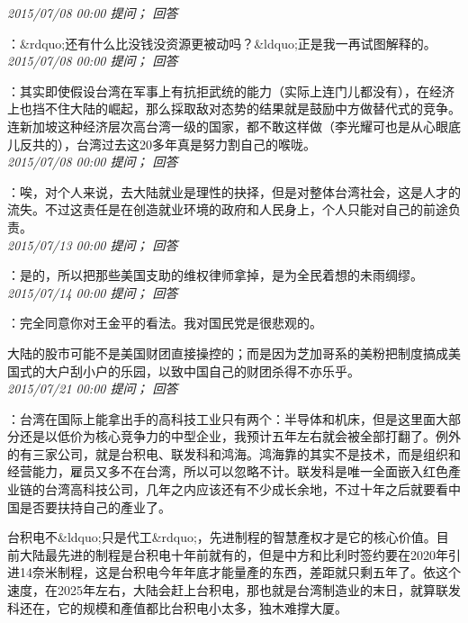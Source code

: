 \documentclass[twocolumn]{ctexart}
\begin{document}
\textit{\hfill\noindent\small 2015/07/08 00:00 提问； 回答}

：\&rdquo;还有什么比没钱没资源更被动吗？\&ldquo;正是我一再试图解释的。\\

\textit{\hfill\noindent\small 2015/07/08 00:00 提问； 回答}

：其实即使假设台湾在军事上有抗拒武统的能力（实际上连门儿都没有），在经济上也挡不住大陆的崛起，那么採取敌对态势的结果就是鼓励中方做替代式的竞争。连新加坡这种经济层次高台湾一级的国家，都不敢这样做（李光耀可也是从心眼底儿反共的），台湾过去这20多年真是努力割自己的喉咙。\\

\textit{\hfill\noindent\small 2015/07/08 00:00 提问； 回答}

：唉，对个人来说，去大陆就业是理性的抉择，但是对整体台湾社会，这是人才的流失。不过这责任是在创造就业环境的政府和人民身上，个人只能对自己的前途负责。\\

\textit{\hfill\noindent\small 2015/07/13 00:00 提问； 回答}

：是的，所以把那些美国支助的维权律师拿掉，是为全民着想的未雨绸缪。\\

\textit{\hfill\noindent\small 2015/07/14 00:00 提问； 回答}

：完全同意你对王金平的看法。我对国民党是很悲观的。

大陆的股市可能不是美国财团直接操控的；而是因为芝加哥系的美粉把制度搞成美国式的大户刮小户的乐园，以致中国自己的财团杀得不亦乐乎。\\

\textit{\hfill\noindent\small 2015/07/21 00:00 提问； 回答}

：台湾在国际上能拿出手的高科技工业只有两个：半导体和机床，但是这里面大部分还是以低价为核心竞争力的中型企业，我预计五年左右就会被全部打翻了。例外的有三家公司，就是台积电、联发科和鸿海。鸿海靠的其实不是技术，而是组织和经营能力，雇员又多不在台湾，所以可以忽略不计。联发科是唯一全面嵌入红色產业链的台湾高科技公司，几年之内应该还有不少成长余地，不过十年之后就要看中国是否要扶持自己的產业了。

台积电不\&ldquo;只是代工\&rdquo;，先进制程的智慧產权才是它的核心价值。目前大陆最先进的制程是台积电十年前就有的，但是中方和比利时签约要在2020年引进14奈米制程，这是台积电今年年底才能量產的东西，差距就只剩五年了。依这个速度，在2025年左右，大陆会赶上台积电，那也就是台湾制造业的末日，就算联发科还在，它的规模和產值都比台积电小太多，独木难撑大厦。\\
\end{document}
